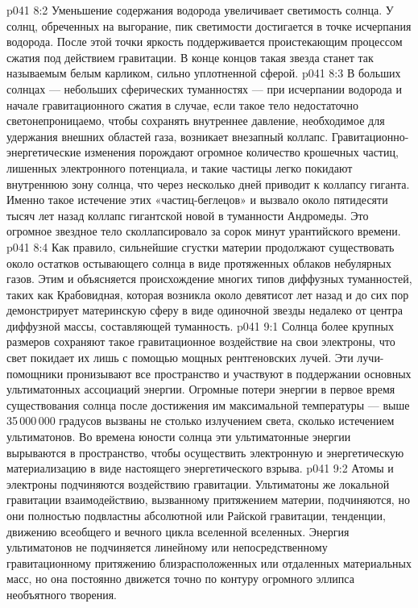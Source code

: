 \vs p041 8:2 \pc Уменьшение содержания водорода увеличивает светимость солнца. У солнц, обреченных на выгорание, пик светимости достигается в точке исчерпания водорода. После этой точки яркость поддерживается проистекающим процессом сжатия под действием гравитации. В конце концов такая звезда станет так называемым белым карликом, сильно уплотненной сферой.
\vs p041 8:3 \pc В больших солнцах --- небольших сферических туманностях --- при исчерпании водорода и начале гравитационного сжатия в случае, если такое тело недостаточно светонепроницаемо, чтобы сохранять внутреннее давление, необходимое для удержания внешних областей газа, возникает внезапный коллапс. Гравитационно\hyp{}энергетические изменения порождают огромное количество крошечных частиц, лишенных электронного потенциала, и такие частицы легко покидают внутреннюю зону солнца, что через несколько дней приводит к коллапсу гиганта. Именно такое истечение этих «частиц\hyp{}беглецов» и вызвало около пятидесяти тысяч лет назад коллапс гигантской новой в туманности Андромеды. Это огромное звездное тело сколлапсировало за сорок минут урантийского времени.
\vs p041 8:4 Как правило, сильнейшие сгустки материи продолжают существовать около остатков остывающего солнца в виде протяженных облаков небулярных газов. Этим и объясняется происхождение многих типов диффузных туманностей, таких как Крабовидная, которая возникла около девятисот лет назад и до сих пор демонстрирует материнскую сферу в виде одиночной звезды недалеко от центра диффузной массы, составляющей туманность.
\vs p041 9:1 Солнца более крупных размеров сохраняют такое гравитационное воздействие на свои электроны, что свет покидает их лишь с помощью мощных рентгеновских лучей. Эти лучи\hyp{}помощники пронизывают все пространство и участвуют в поддержании основных ультиматонных ассоциаций энергии. Огромные потери энергии в первое время существования солнца после достижения им максимальной температуры --- выше 35\,000\,000 градусов вызваны не столько излучением света, сколько истечением ультиматонов. Во времена юности солнца эти ультиматонные энергии вырываются в пространство, чтобы осуществить электронную и энергетическую материализацию в виде настоящего энергетического взрыва.
\vs p041 9:2 \pc Атомы и электроны подчиняются воздействию гравитации. Ультиматоны же локальной гравитации взаимодействию, вызванному притяжением материи,  подчиняются, но они полностью подвластны абсолютной или Райской гравитации, тенденции, движению всеобщего и вечного цикла вселенной вселенных. Энергия ультиматонов не подчиняется линейному или непосредственному гравитационному притяжению близрасположенных или отдаленных материальных масс, но она постоянно движется точно по контуру огромного эллипса необъятного творения.
